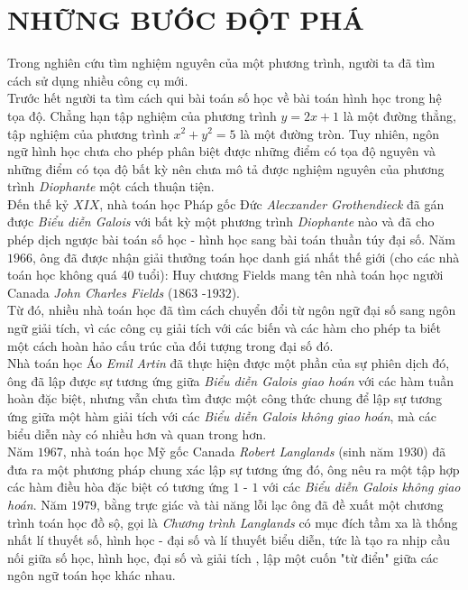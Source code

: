 \section{NHỮNG BƯỚC ĐỘT PHÁ}\label{dotpha}

Trong nghiên cứu tìm nghiệm nguyên của một phương trình, người ta đã tìm cách sử dụng nhiều công cụ mới. \\
Trước hết người ta tìm cách qui bài toán số học về bài toán hình học trong hệ tọa độ. Chẳng hạn tập nghiệm của phương trình $y=2x+1$ là một đường thẳng, tập nghiệm của phương trình $x^2+y^2=5$ là một đường tròn. Tuy nhiên, ngôn ngữ hình học chưa cho phép phân biệt được những điểm có tọa độ nguyên và những điểm có tọa độ bất kỳ nên chưa mô tả được nghiệm nguyên của phương trình \textit{Diophante} một cách thuận tiện.\\
Đến thế kỷ $XIX$, nhà toán học Pháp gốc Đức \textit{Alecxander Grothendieck} đã gán được \textit{Biểu diễn Galois} với bất kỳ một phương trình \textit{Diophante} nào và đã cho phép dịch ngược bài toán số học - hình học sang bài toán thuần túy đại số. Năm $1966$, ông đã được nhận giải thưởng toán học danh giá nhất thế giới (cho các nhà toán học không quá $40$ tuổi): Huy chương Fields mang tên nhà toán học người Canada \textit{John Charles Fields} ($1863$ -$1932$).\\
Từ đó, nhiều nhà toán học đã tìm cách chuyển đổi từ ngôn ngữ đại số sang ngôn ngữ giải tích, vì các công cụ giải tích với các biến và các hàm cho phép ta biết một cách hoàn hảo cấu trúc của đối tượng trong đại số đó.\\
Nhà toán học Áo \textit{Emil Artin} đã thực hiện được một phần của sự phiên dịch đó, ông đã lập được sự tương ứng giữa \textit{Biểu diễn Galois giao hoán} với các hàm tuần hoàn đặc biệt, nhưng vẫn chưa tìm được một công thức chung để lập sự tương ứng giữa một hàm giải tích với các \textit{Biểu diễn Galois không giao hoán}, mà các biểu diễn này có nhiều hơn và quan trong hơn.\\
Năm $1967$, nhà toán học Mỹ gốc Canada \textit{Robert Langlands} (sinh năm $1930$) đã đưa ra một phương pháp chung xác lập sự tương ứng đó, ông nêu ra một tập hợp các hàm điều hòa đặc biệt có tương ứng $1$ - $1$ với các \textit{Biểu diễn Galois không giao hoán}. Năm $1979$, bằng trực giác và tài năng lỗi lạc ông đã đề xuất một chương trình toán học đồ sộ, gọi là \textit{Chương trình Langlands} có mục đích tầm xa là thống nhất lí thuyết số, hình học - đại số và lí thuyết biểu diễn, tức là tạo ra nhịp cầu nối giữa số học, hình học, đại số và giải tích , lập một cuốn "từ điển" giữa các ngôn ngữ toán học khác nhau.\\
